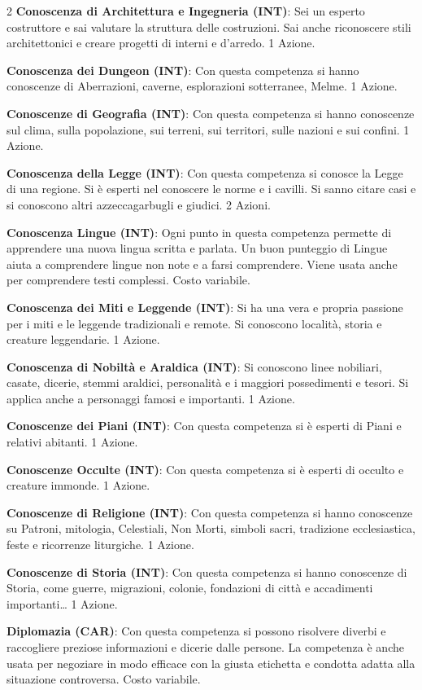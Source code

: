 \begin{multicols}{2}
\textbf{Conoscenza di Architettura e Ingegneria (INT)}: Sei un esperto costruttore e sai valutare la struttura delle costruzioni. Sai anche riconoscere stili architettonici e creare progetti di interni e d'arredo. 1 Azione.

\textbf{Conoscenza dei Dungeon (INT)}: Con questa competenza si hanno conoscenze di Aberrazioni, caverne, esplorazioni sotterranee, Melme. 1 Azione.

\textbf{Conoscenze di Geografia (INT)}: Con questa competenza si hanno conoscenze sul clima, sulla popolazione, sui terreni, sui territori, sulle nazioni e sui confini. 1 Azione.

\textbf{Conoscenza della Legge (INT)}: Con questa competenza si conosce la Legge di una regione. Si è esperti nel conoscere le norme e i cavilli. Si sanno citare casi e si conoscono altri azzeccagarbugli e giudici. 2 Azioni.

\textbf{Conoscenza Lingue (INT)}: Ogni punto in questa competenza permette di apprendere una nuova lingua scritta e parlata. Un buon punteggio di Lingue aiuta a comprendere lingue non note e a farsi comprendere. Viene usata anche per comprendere testi complessi. Costo variabile.

\textbf{Conoscenza dei Miti e Leggende (INT)}: Si ha una vera e propria passione per i miti e le leggende tradizionali e remote. Si conoscono località, storia e creature leggendarie. 1 Azione.

\textbf{Conoscenza di Nobiltà e Araldica (INT)}: Si conoscono linee nobiliari, casate, dicerie, stemmi araldici, personalità e i maggiori possedimenti e tesori. Si applica anche a personaggi famosi e importanti. 1 Azione.

\textbf{Conoscenze dei Piani (INT)}: Con questa competenza si è esperti di Piani e relativi abitanti. 1 Azione.

\textbf{Conoscenze Occulte (INT)}: Con questa competenza si è esperti di occulto e creature immonde. 1 Azione.

\textbf{Conoscenze di Religione (INT)}: Con questa competenza si hanno conoscenze su Patroni, mitologia, Celestiali, Non Morti, simboli sacri, tradizione ecclesiastica, feste e ricorrenze liturgiche. 1 Azione.

\textbf{Conoscenze di Storia (INT)}: Con questa competenza si hanno conoscenze di Storia, come guerre, migrazioni, colonie, fondazioni di città e accadimenti importanti… 1 Azione.

\textbf{Diplomazia (CAR)}: Con questa competenza si possono risolvere diverbi e raccogliere preziose informazioni e dicerie dalle persone. La competenza è anche usata per negoziare in modo efficace con la giusta etichetta e condotta adatta alla situazione controversa. Costo variabile.


\end{multicols}
